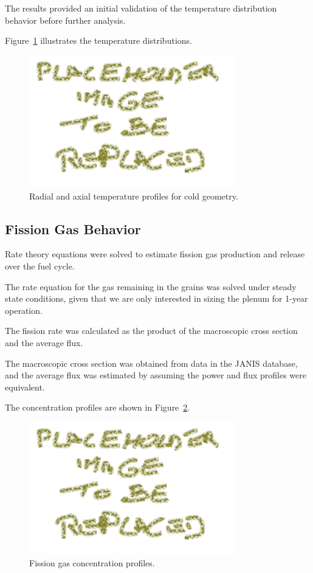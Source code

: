 The results provided an initial validation of the temperature distribution behavior before further analysis.

Figure~\ref{fig:temperature_profile} illustrates the temperature distributions.

\begin{figure}[H]
\centering
\includegraphics[width=0.8\textwidth]{placeholder.png}
\caption{Radial and axial temperature profiles for cold geometry.}
\label{fig:temperature_profile}
\end{figure}

\subsection{Fission Gas Behavior}
Rate theory equations were solved to estimate fission gas production and release over the fuel cycle.

The rate equation for the gas remaining in the grains was solved under steady state conditions, given that we are only interested in sizing the plenum for 1-year operation.

The fission rate was calculated as the product of the macroscopic cross section and the average flux.

The macroscopic cross section was obtained from data in the JANIS database, and the average flux was estimated by assuming the power and flux profiles were equivalent.

The concentration profiles are shown in Figure~\ref{fig:fission_gas}.

\begin{figure}[H]
\centering
\includegraphics[width=0.8\textwidth]{placeholder.png}
\caption{Fission gas concentration profiles.}
\label{fig:fission_gas}
\end{figure}
